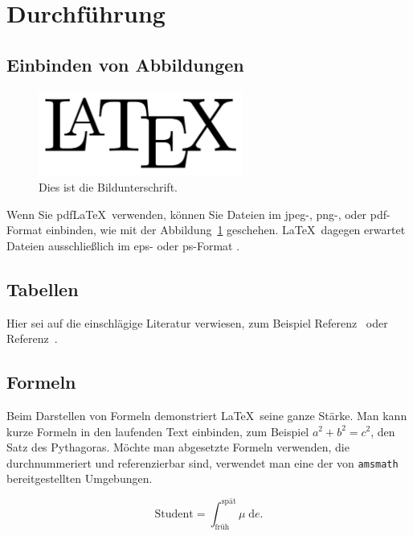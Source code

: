 \documentclass[
	fontsize=11pt,
	paper=a4,
	pagesize=auto,
	parskip=half,
	titlepage=on,
	ngerman
]{scrartcl}
\begin{document}
\section{Durchführung}

\subsection{Einbinden von Abbildungen}

\begin{figure}[htb]
	\centering
	\includegraphics[width=0.6\textwidth]{Bild}
	\caption{Dies ist die Bildunterschrift.}\label{Bild}
\end{figure}

Wenn Sie pdf\LaTeX\ verwenden, können Sie Dateien im jpeg-, png-, oder pdf-Format einbinden, wie mit der Abbildung~\ref{Bild} geschehen. \LaTeX\ dagegen erwartet Dateien ausschließlich im eps- oder ps-Format \cite{andyroberts}.

\subsection{Tabellen}

Hier sei auf die einschlägige Literatur verwiesen, zum Beispiel Referenz~\cite{andyroberts} oder Referenz~\cite{hobbits}.

\subsection{Formeln}

Beim Darstellen von Formeln demonstriert \LaTeX\ seine ganze Stärke. Man kann kurze Formeln in den laufenden Text einbinden, zum Beispiel $a^2+b^2=c^2$, den Satz des Pythagoras. Möchte man abgesetzte Formeln verwenden, die durchnummeriert und referenzierbar sind, verwendet man eine der von \texttt{amsmath} \cite[Table 3.1]{amsmath} bereitgestellten Umgebungen.

\begin{equation}
	\textrm{Student} = \int_\textrm{früh}^\textrm{spät} \mu \; \mathrm{d}e. \label{formel1}
\end{equation}
\end{document}

